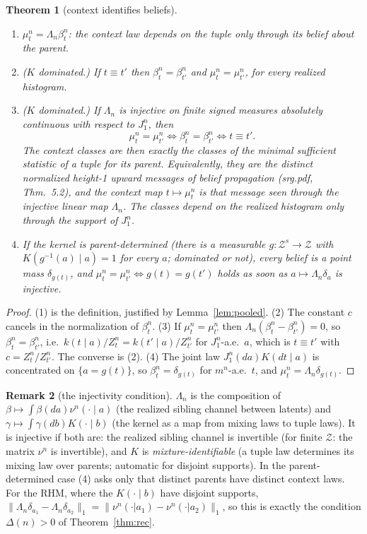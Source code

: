 \documentclass[11pt]{article}
\newtheorem{theorem}{Theorem}
\theoremstyle{definition}
\newtheorem{remark}[theorem]{Remark}
\newcommand{\norm}[1]{\lVert #1\rVert}
\begin{document}
\begin{theorem}[context identifies beliefs]\label{thm:mng}
\begin{enumerate}
\item $\mu^n_t=\Lambda_n\beta^n_t$: the context law depends on the tuple only through its belief
about the parent.
\item ($K$ dominated.) If $t\equiv t'$ then $\beta^n_t=\beta^n_{t'}$ and $\mu^n_t=\mu^n_{t'}$, for \emph{every}
realized histogram.
\item ($K$ dominated.) If $\Lambda_n$ is injective on finite signed measures absolutely continuous with respect
to $J^n_1$, then
\[
\mu^n_t=\mu^n_{t'}\iff\beta^n_t=\beta^n_{t'}\iff t\equiv t'.
\]
The context classes are then exactly the classes of the minimal sufficient statistic of a tuple
for its parent. Equivalently, they are the distinct normalized height-1 upward messages of
belief propagation (srg.pdf, Thm.~5.2), and the context map $t\mapsto\mu^n_t$ is that message
seen through the injective linear map $\Lambda_n$. The classes depend on the realized histogram
only through the support of $J^n_1$.
\item If the kernel is \emph{parent-determined} (there is a measurable $g:\mathcal Z^s\to\mathcal Z$
with $K(g^{-1}(a)\mid a)=1$ for every $a$; dominated or not), every belief is a point mass
$\delta_{g(t)}$, and $\mu^n_t=\mu^n_{t'}\iff g(t)=g(t')$ holds as soon as $a\mapsto\Lambda_n\delta_a$
is injective.
\end{enumerate}
\end{theorem}
\begin{proof}
(1) is the definition, justified by Lemma~\ref{lem:pooled}. (2) The constant $c$ cancels in the
normalization of $\beta^n_t$. (3) If $\mu^n_t=\mu^n_{t'}$ then $\Lambda_n(\beta^n_t-\beta^n_{t'})=0$,
so $\beta^n_t=\beta^n_{t'}$, i.e.\ $k(t\mid a)/Z^n_t=k(t'\mid a)/Z^n_{t'}$ for $J^n_1$-a.e.\ $a$,
which is $t\equiv t'$ with $c=Z^n_t/Z^n_{t'}$. The converse is (2). (4) The joint law $J^n_1(da)K(dt\mid a)$ is concentrated on
$\{a=g(t)\}$, so $\beta^n_t=\delta_{g(t)}$ for $m^n$-a.e.\ $t$, and $\mu^n_t=\Lambda_n\delta_{g(t)}$.
\end{proof}

\begin{remark}[the injectivity condition]
$\Lambda_n$ is the composition of $\beta\mapsto\int\beta(da)\nu^n(\cdot\mid a)$ (the realized
sibling channel between latents) and $\gamma\mapsto\int\gamma(db)K(\cdot\mid b)$ (the kernel as a
map from mixing laws to tuple laws). It is injective if both are: the realized sibling channel is
invertible (for finite $\mathcal Z$: the matrix $\nu^n$ is invertible), and $K$ is
\emph{mixture-identifiable} (a tuple law determines its mixing law over parents; automatic for
disjoint supports). In the parent-determined case (4) asks only that distinct parents have
distinct context laws. For the RHM, where the $K(\cdot\mid b)$ have disjoint supports,
$\norm{\Lambda_n\delta_{a_1}-\Lambda_n\delta_{a_2}}_1=\norm{\nu^n(\cdot|a_1)-\nu^n(\cdot|a_2)}_1$,
so this is exactly the condition $\Delta(n)>0$ of Theorem~\ref{thm:rec}.
\end{remark}
\end{document}
